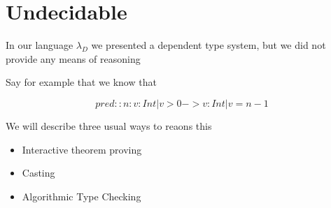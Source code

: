 \section{Undecidable}

In our language $\lambda_D$ we presented a dependent type system, 
but we did not provide any means of reasoning 

Say for example that we know that 

$$
pred :: n:{v:Int | v > 0} -> {v:Int | v = n - 1}
$$

We will describe three usual ways to reaons this

\begin{itemize}
\item Interactive theorem proving
\item Casting
\item Algorithmic Type Checking
\end{itemize}

